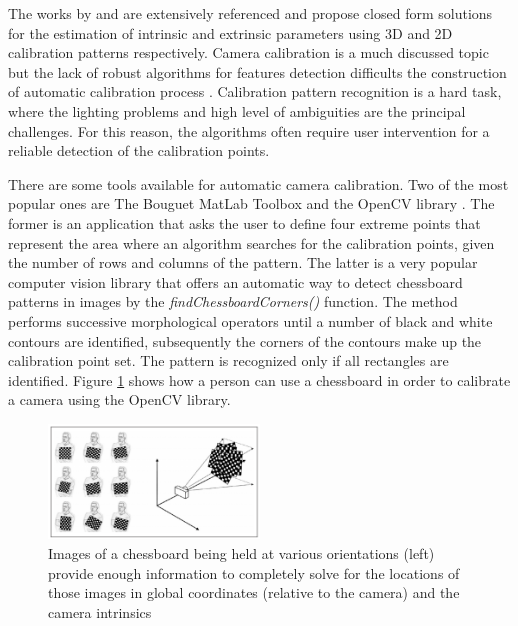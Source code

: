 \documentclass[msc, a4paper, classic, en]{ufbathesis}
\begin{document}
The works by \cite{Tsai86} and \cite{zhang2000flexible} are extensively referenced and propose closed form solutions for the estimation of intrinsic and extrinsic parameters using 3D and 2D calibration patterns respectively. Camera calibration is a much discussed topic but the lack of robust algorithms for features detection difficults the construction of automatic calibration process \cite{gustavo}. Calibration pattern recognition is a hard task, where the lighting problems and high level of ambiguities are the principal challenges. For this reason, the algorithms often require user intervention for a reliable detection of the calibration points.

There are some tools available for automatic camera calibration. Two of the most popular ones are The Bouguet MatLab Toolbox \cite{matlab} and the OpenCV library \cite{opencv}. The former is an application that asks the user to define four extreme points that represent the area where an algorithm searches for the calibration points, given the number of rows and columns of the pattern. The latter is a very popular computer vision library that offers an automatic way to detect chessboard patterns in images by the \textit{findChessboardCorners()} function. The method performs successive morphological operators until a number of black and white contours are identified, subsequently the corners of the contours make up the calibration point set. The pattern is recognized only if all rectangles are identified. Figure \ref{fig:chessboard} shows how a person can use a chessboard in order to calibrate a camera using the OpenCV library.

\begin{figure}
\label{fig:chessboard}
\centering
\includegraphics[width=0.5\textwidth]{images/chessboard.png}
\caption{Images of a chessboard being held at various orientations (left) provide enough information to completely solve for the locations of those images in global coordinates (relative to the
camera) and the camera intrinsics \cite{bradski2008learning}}
\end{figure}
\end{document}
